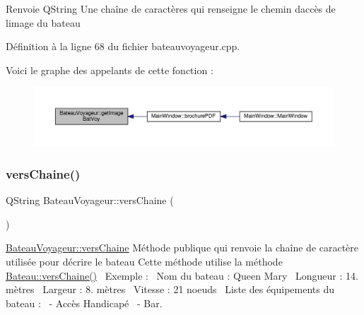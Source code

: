 \begin{DoxyReturn}{Renvoie}
Q\+String Une chaîne de caractères qui renseigne le chemin d\textquotesingle{}accès de l\textquotesingle{}image du bateau 
\end{DoxyReturn}


Définition à la ligne 68 du fichier bateauvoyageur.\+cpp.

Voici le graphe des appelants de cette fonction \+:\nopagebreak
\begin{figure}[H]
\begin{center}
\leavevmode
\includegraphics[width=350pt]{class_bateau_voyageur_a3154786b2f572d0c2a2ac975757295eb_icgraph}
\end{center}
\end{figure}
\mbox{\label{class_bateau_voyageur_a3fa14cf7db3a1a35457f1e0450d7e8b2}} 
\subsubsection{\texorpdfstring{vers\+Chaine()}{versChaine()}}
{\footnotesize\ttfamily Q\+String Bateau\+Voyageur\+::vers\+Chaine (\begin{DoxyParamCaption}{ }\end{DoxyParamCaption})}



\hyperlink{class_bateau_voyageur_a3fa14cf7db3a1a35457f1e0450d7e8b2}{Bateau\+Voyageur\+::vers\+Chaine} Méthode publique qui renvoie la chaîne de caractère utilisée pour décrire le bateau Cette méthode utilise la méthode \hyperlink{class_bateau_a392f6a45649a2a35186dfcd1ca58eddc}{Bateau\+::vers\+Chaine()}~\newline
Exemple \+:~\newline
Nom du bateau \+: Queen Mary~\newline
Longueur \+: 14. mètres~\newline
Largeur \+: 8. mètres~\newline
Vitesse \+: 21 noeuds~\newline
Liste des équipements du bateau \+:~\newline
-\/ Accès Handicapé~\newline
-\/ Bar. 

